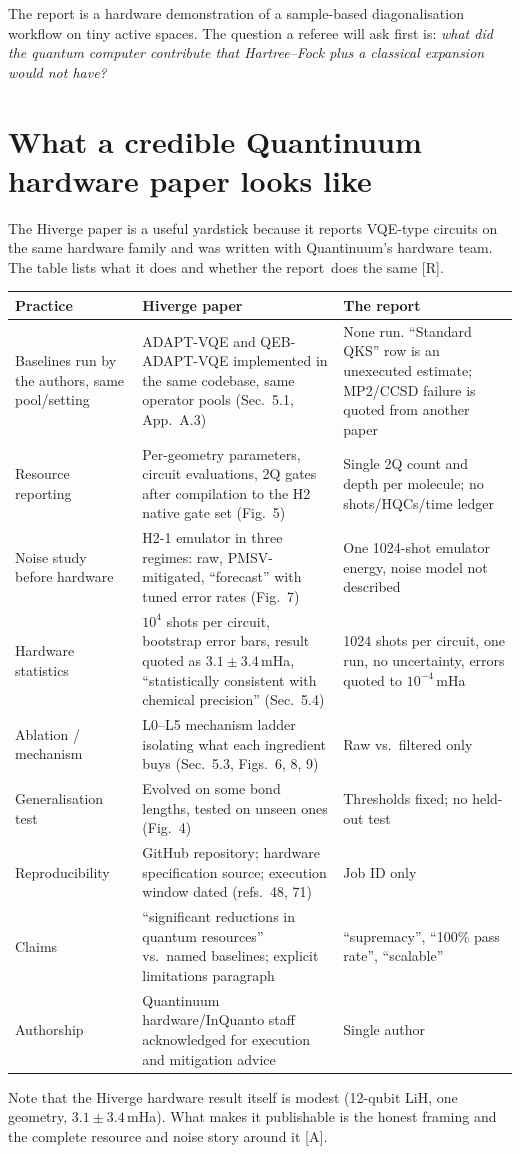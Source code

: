 \documentclass[11pt,a4paper]{article}
\newcommand{\report}{the report}
\newcommand{\lR}{\textcolor{keyblue}{[R]}}   %
\newcommand{\lA}{\textcolor{notegray}{[A]}}  %
\newcommand{\takeaway}[1]{\par\smallskip\noindent{\bfseries\textcolor{keyblue}{Takeaway.}} #1\par\smallskip}
\begin{document}
\takeaway{The report is a hardware demonstration of a sample-based diagonalisation workflow on tiny active spaces. The question a referee will ask first is: \emph{what did the quantum computer contribute that Hartree--Fock plus a classical expansion would not have?}}

\section{What a credible Quantinuum hardware paper looks like}\label{sec:hiverge}
The Hiverge paper is a useful yardstick because it reports VQE-type circuits on the same hardware family and was written with Quantinuum's hardware team. The table lists what it does and whether \report\ does the same \lR.
\begin{center}\small
\begin{tabularx}{\linewidth}{@{}L{3.6cm}YY@{}}
\toprule
Practice & Hiverge paper & The report\\\midrule
Baselines run by the authors, same pool/setting & ADAPT-VQE and QEB-ADAPT-VQE implemented in the same codebase, same operator pools (Sec.~5.1, App.~A.3) & None run. ``Standard QKS'' row is an unexecuted estimate; MP2/CCSD failure is quoted from another paper\\
Resource reporting & Per-geometry parameters, circuit evaluations, 2Q gates after compilation to the H2 native gate set (Fig.~5) & Single 2Q count and depth per molecule; no shots/HQCs/time ledger\\
Noise study before hardware & H2-1 emulator in three regimes: raw, PMSV-mitigated, ``forecast'' with tuned error rates (Fig.~7) & One 1024-shot emulator energy, noise model not described\\
Hardware statistics & $10^4$ shots per circuit, bootstrap error bars, result quoted as $3.1\pm3.4$\,mHa, ``statistically consistent with chemical precision'' (Sec.~5.4) & 1024 shots per circuit, one run, no uncertainty, errors quoted to $10^{-4}$\,mHa\\
Ablation / mechanism & L0--L5 mechanism ladder isolating what each ingredient buys (Sec.~5.3, Figs.~6, 8, 9) & Raw vs.\ filtered only\\
Generalisation test & Evolved on some bond lengths, tested on unseen ones (Fig.~4) & Thresholds fixed; no held-out test\\
Reproducibility & GitHub repository; hardware specification source; execution window dated (refs.~48, 71) & Job ID only\\
Claims & ``significant reductions in quantum resources'' vs.\ named baselines; explicit limitations paragraph & ``supremacy'', ``100\% pass rate'', ``scalable''\\
Authorship & Quantinuum hardware/InQuanto staff acknowledged for execution and mitigation advice & Single author\\
\bottomrule
\end{tabularx}
\end{center}
Note that the Hiverge hardware result itself is modest (12-qubit LiH, one geometry, $3.1\pm3.4$\,mHa). What makes it publishable is the honest framing and the complete resource and noise story around it \lA.
\end{document}
